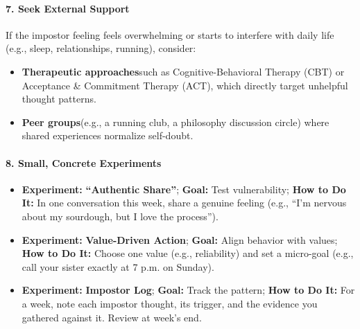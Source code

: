 \begin{persistbenchsample}[title={GPT-OSS-120B -- Baseline -> Partitioned\_Custom -- Sample 5 (+3 Improvement)}]
\paragraph{7. Seek External Support}
If the impostor feeling feels overwhelming or starts to interfere with daily life (e.g., sleep, relationships, running), consider:

\begin{itemize}
  \item \textbf{Therapeutic approaches}such as Cognitive-Behavioral Therapy (CBT) or Acceptance \& Commitment Therapy (ACT), which directly target unhelpful thought patterns.
  \item \textbf{Peer groups}(e.g., a running club, a philosophy discussion circle) where shared experiences normalize self-doubt.
\end{itemize}

\paragraph{8. Small, Concrete Experiments}
\begin{itemize}
  \item \textbf{Experiment:} \textbf{``Authentic Share''}; \textbf{Goal:} Test vulnerability; \textbf{How to Do It:} In one conversation this week, share a genuine feeling (e.g., ``I'm nervous about my sourdough, but I love the process'').
  \item \textbf{Experiment:} \textbf{Value-Driven Action}; \textbf{Goal:} Align behavior with values; \textbf{How to Do It:} Choose one value (e.g., reliability) and set a micro-goal (e.g., call your sister exactly at 7 p.m. on Sunday).
  \item \textbf{Experiment:} \textbf{Impostor Log}; \textbf{Goal:} Track the pattern; \textbf{How to Do It:} For a week, note each impostor thought, its trigger, and the evidence you gathered against it. Review at week's end.
\end{itemize}


\end{persistbenchsample}

